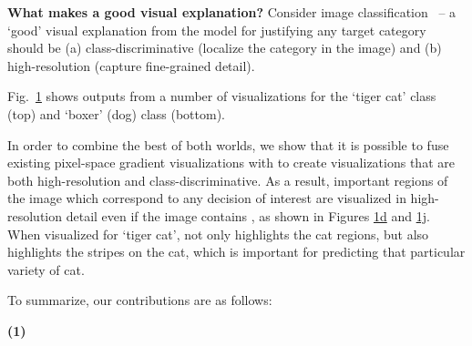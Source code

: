 \noindent \textbf{What makes a good visual explanation?}
Consider image classification~\cite{imagenet_cvpr09} -- a `good’ visual explanation from the model for justifying any target category should be (a) class-discriminative (\ie localize the category in the image) and (b) high-resolution (\ie capture fine-grained detail).

Fig.~\hyperlink{page.2}{1} shows outputs from a number of visualizations for the `tiger cat' class (top) and `boxer' (dog) class (bottom).




In order to combine the best of both worlds, we show that it is possible to fuse existing pixel-space gradient visualizations with \gcam{} to create \cgb{} visualizations that are both high-resolution and class-discriminative. As a result, important regions of the image which correspond to any decision of interest are visualized in high-resolution detail even if the image contains  , as shown in Figures \hyperlink{page.2}{1d} and \hyperlink{page.2}{1j}.
When visualized for `tiger cat', \cgb{} not only highlights the cat regions, but also highlights the stripes on the cat, which is important for predicting that particular variety of cat.
















\noindent To summarize, our contributions are as follows:

\noindent \textbf{(1)}

